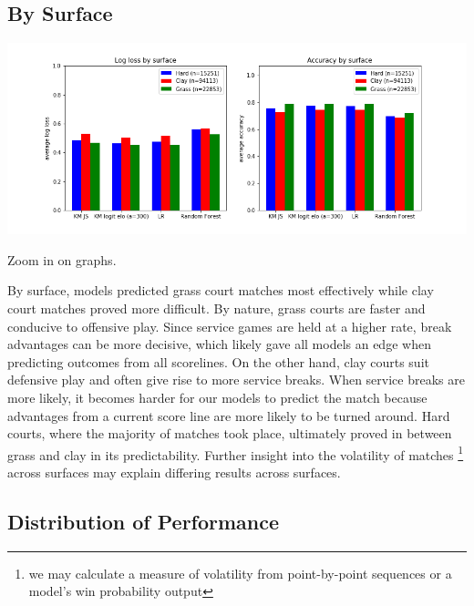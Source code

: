 \documentclass[chapterprefix=false]{report}
\begin{document}


\subsection{By Surface}

\hspace*{-1.5cm}\includegraphics[scale=.6]{surface_performance}

Zoom in on graphs. 

By surface, models predicted grass court matches most effectively while clay court matches proved more difficult. By nature, grass courts are faster and conducive to offensive play. Since service games are held at a higher rate, break advantages can be more decisive, which likely gave all models an edge when predicting outcomes from all scorelines. On the other hand, clay courts suit defensive play and often give rise to more service breaks. When service breaks are more likely, it becomes harder for our models to predict the match because advantages from a current score line are more likely to be turned around. Hard courts, where the majority of matches took place, ultimately proved in between grass and clay in its predictability. Further insight into the volatility of matches \footnote{we may calculate a measure of volatility from point-by-point sequences or a model's win probability output} across surfaces may explain differing results across surfaces.

\subsection{Distribution of Performance}
\end{document}
